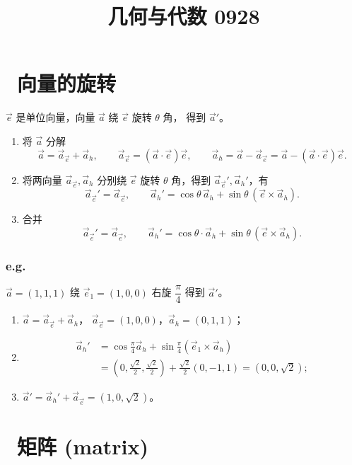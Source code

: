 \documentclass[UTF8,11pt]{ctexart}
\title{几何与代数 0928}
\date{}
\theoremstyle{cnthm}
\begin{document}
\maketitle

\section{\ 向量的旋转}

$\vec e$ 是单位向量，向量 $\vec a$ 绕 $\vec e$ 旋转 $\theta$ 角，
得到 $\vec a'$。

\begin{enumerate}
\item 将 $\vec a$ 分解
\[
\vec a=\vec a_{\vec e}+\vec a_h,\qquad
\vec a_{\vec e}=(\vec a\cdot\vec e)\vec e,\qquad
\vec a_h=\vec a-\vec a_{\vec e}
=\vec a-(\vec a\cdot\vec e)\vec e .
\]
\item 将两向量 $\vec a_{\vec e},\vec a_h$ 分别绕 $\vec e$
旋转 $\theta$ 角，得到 $\vec a_{\vec e}',\vec a_h'$，有
\[
\vec a_{\vec e}'=\vec a_{\vec e},\qquad
\vec a_h'=\cos\theta\,\vec a_h+\sin\theta\,(\vec e\times\vec a_h).
\]
\item 合并
\[
\vec a_{\vec e}'=\vec a_{\vec e},\qquad
\vec a_h'=\cos\theta\cdot\vec a_h+\sin\theta\,(\vec e\times\vec a_h).
\]
\end{enumerate}

\subsubsection*{e.g.}

$\vec a=(1,1,1)$ 绕 $\vec e_1=(1,0,0)$ 右旋
$\dfrac\pi4$ 得到 $\vec a'$。

\begin{enumerate}
\item $\vec a=\vec a_{\vec e}+\vec a_h$，
$\vec a_{\vec e}=(1,0,0)$，$\vec a_h=(0,1,1)$；
\item
\[
\begin{aligned}
\vec a_h'
&=\cos\frac\pi4\vec a_h+\sin\frac\pi4(\vec e_1\times\vec a_h)\\
&=\left(0,\frac{\sqrt2}{2},\frac{\sqrt2}{2}\right)
+\frac{\sqrt2}{2}(0,-1,1)=(0,0,\sqrt2);
\end{aligned}
\]
\item $\vec a'=\vec a_h'+\vec a_{\vec e}=(1,0,\sqrt2)$。
\end{enumerate}

\section{\ 矩阵 (matrix)}
\end{document}
